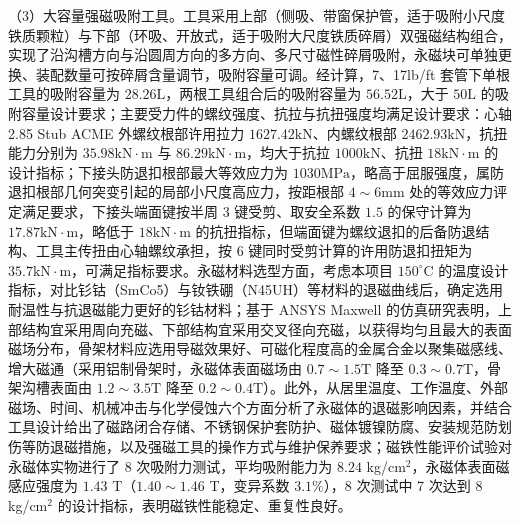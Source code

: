 （3）大容量强磁吸附工具。工具采用上部（侧吸、带窗保护管，适于吸附小尺度铁质颗粒）与下部（环吸、开放式，适于吸附大尺度铁质碎屑）双强磁结构组合，实现了沿沟槽方向与沿圆周方向的多方向、多尺寸磁性碎屑吸附，永磁块可单独更换、装配数量可按碎屑含量调节，吸附容量可调。经计算，7\inch、17lb/ft 套管下单根工具的吸附容量为 $28.26\mathrm{L}$，两根工具组合后的吸附容量为 $56.52\mathrm{L}$，大于 $50\mathrm{L}$ 的吸附容量设计要求；主要受力件的螺纹强度、抗拉与抗扭强度均满足设计要求：心轴 2.85 Stub ACME 外螺纹根部许用拉力 $1627.42\mathrm{kN}$、内螺纹根部 $2462.93\mathrm{kN}$，抗扭能力分别为 $35.98\mathrm{kN\cdot m}$ 与 $86.29\mathrm{kN\cdot m}$，均大于抗拉 $1000\mathrm{kN}$、抗扭 $18\mathrm{kN\cdot m}$ 的设计指标；下接头防退扣根部最大等效应力为 $1030\mathrm{MPa}$，略高于屈服强度，属防退扣根部几何突变引起的局部小尺度高应力，按距根部 $4\sim6\mathrm{mm}$ 处的等效应力评定满足要求，下接头端面键按半周 3 键受剪、取安全系数 $1.5$ 的保守计算为 $17.87\mathrm{kN\cdot m}$，略低于 $18\mathrm{kN\cdot m}$ 的抗扭指标，但端面键为螺纹退扣的后备防退结构、工具主传扭由心轴螺纹承担，按 6 键同时受剪计算的许用防退扣扭矩为 $35.7\mathrm{kN\cdot m}$，可满足指标要求。永磁材料选型方面，考虑本项目 $150^\circ\mathrm{C}$ 的温度设计指标，对比钐钴（SmCo5）与钕铁硼（N45UH）等材料的退磁曲线后，确定选用耐温性与抗退磁能力更好的钐钴材料；基于 ANSYS Maxwell 的仿真研究表明，上部结构宜采用周向充磁、下部结构宜采用交叉径向充磁，以获得均匀且最大的表面磁场分布，骨架材料应选用导磁效果好、可磁化程度高的金属合金以聚集磁感线、增大磁通（采用铝制骨架时，永磁体表面磁场由 $0.7\sim1.5\mathrm{T}$ 降至 $0.3\sim0.7\mathrm{T}$，骨架沟槽表面由 $1.2\sim3.5\mathrm{T}$ 降至 $0.2\sim0.4\mathrm{T}$）。此外，从居里温度、工作温度、外部磁场、时间、机械冲击与化学侵蚀六个方面分析了永磁体的退磁影响因素，并结合工具设计给出了磁路闭合存储、不锈钢保护套防护、磁体镀镍防腐、安装规范防划伤等防退磁措施，以及强磁工具的操作方式与维护保养要求；磁铁性能评价试验对永磁体实物进行了 8 次吸附力测试，平均吸附能力为 $8.24$ kg/cm$^{2}$，永磁体表面磁感应强度为 $1.43$ T（$1.40\sim1.46$ T，变异系数 $3.1\%$），8 次测试中 7 次达到 $8$ kg/cm$^{2}$ 的设计指标，表明磁铁性能稳定、重复性良好。

